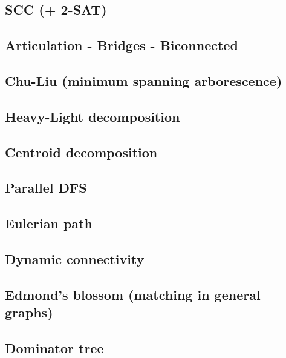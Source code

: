 \begin{multicols}{2}
\subsection{SCC (+ 2-SAT)}

\subsection{Articulation - Bridges - Biconnected}

\subsection{Chu-Liu (minimum spanning arborescence)}

\subsection{Heavy-Light decomposition}

\subsection{Centroid decomposition}

\subsection{Parallel DFS}

\subsection{Eulerian path}

\subsection{Dynamic connectivity}

\subsection{Edmond's blossom (matching in general graphs)}

\subsection{Dominator tree}


\end{multicols}
